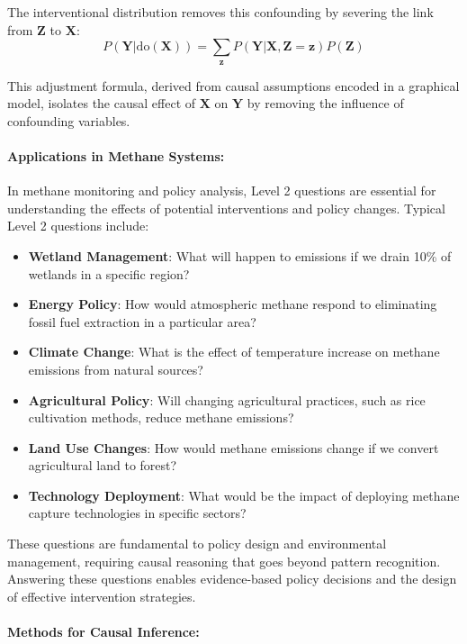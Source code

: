 The interventional distribution removes this confounding by severing the link from $\mathbf{Z}$ to $\mathbf{X}$:
\begin{equation}
	P(\mathbf{Y}|\text{do}(\mathbf{X})) = \sum_{\mathbf{z}} P(\mathbf{Y}|\mathbf{X},\mathbf{Z}=\mathbf{z})P(\mathbf{Z})
\end{equation}

This adjustment formula, derived from causal assumptions encoded in a graphical model, isolates the causal effect of $\mathbf{X}$ on $\mathbf{Y}$ by removing the influence of confounding variables.

\paragraph{Applications in Methane Systems:}

In methane monitoring and policy analysis, Level 2 questions are essential for understanding the effects of potential interventions and policy changes. Typical Level 2 questions include:

\begin{itemize}
	\item \textbf{Wetland Management}: What will happen to emissions if we drain 10\% of wetlands in a specific region?
	\item \textbf{Energy Policy}: How would atmospheric methane respond to eliminating fossil fuel extraction in a particular area?
	\item \textbf{Climate Change}: What is the effect of temperature increase on methane emissions from natural sources?
	\item \textbf{Agricultural Policy}: Will changing agricultural practices, such as rice cultivation methods, reduce methane emissions?
	\item \textbf{Land Use Changes}: How would methane emissions change if we convert agricultural land to forest?
	\item \textbf{Technology Deployment}: What would be the impact of deploying methane capture technologies in specific sectors?
\end{itemize}

These questions are fundamental to policy design and environmental management, requiring causal reasoning that goes beyond pattern recognition. Answering these questions enables evidence-based policy decisions and the design of effective intervention strategies.

\paragraph{Methods for Causal Inference:}

